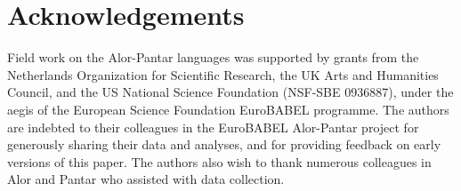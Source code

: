 \section{Acknowledgements}

Field work on the Alor-Pantar languages was supported by grants from the Netherlands Organization for Scientific Research, the UK Arts and Humanities Council, and the US National Science Foundation (NSF-SBE 0936887), under the aegis of the European Science Foundation EuroBABEL programme. The authors are indebted to their colleagues in the EuroBABEL Alor-Pantar project for generously sharing their data and analyses, and for providing feedback on early versions of this paper. The authors also wish to thank numerous colleagues in Alor and Pantar who assisted with data collection.




